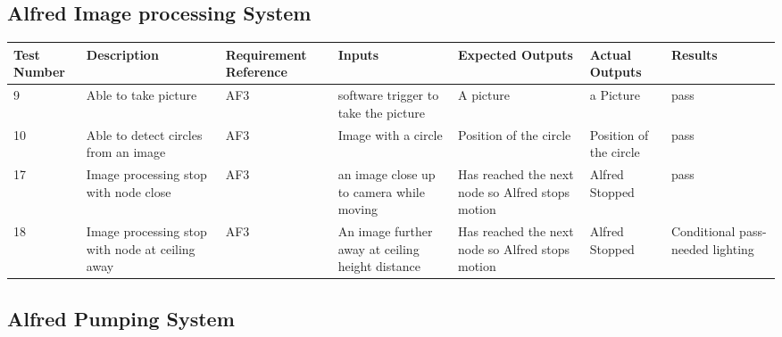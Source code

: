\documentclass [10pt]{article}
\begin{document}
\subsection {Alfred Image processing System}
\begin{longtable}{| p{} | p{} | p{} | p{} | p{} | p{} | p{} |}\hline 
\rowcolor{tableCell}\textbf{Test Number} & \textbf{Description} & \textbf{Requirement Reference} & \textbf{Inputs} & \textbf{Expected Outputs} & \textbf{Actual Outputs}& \textbf{Results} \\ \hline

	9 &  Able to take picture &  AF3 & software trigger to take the picture &  A picture &  a Picture &  pass
\\ \hline
10 &  Able to detect circles from an image &  AF3 &  Image with a circle &  Position of the circle &  Position of the circle &  pass
\\ \hline
	17 &  Image processing stop with node close &  AF3 &  an image close up to camera while moving &  Has reached the next node so Alfred stops motion &  Alfred Stopped &  pass 
	\\ \hline
	18 &  Image processing stop with node at ceiling away &  AF3 &  An image further away at ceiling height distance &  Has reached the next node so Alfred stops motion &  Alfred Stopped &  Conditional pass- needed lighting
	\\ \hline
	
	\end{longtable}






\subsection {Alfred Pumping System}
\end{document}
